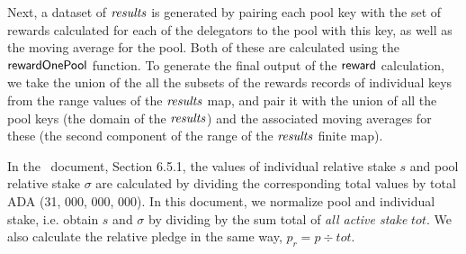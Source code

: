 Next, a dataset of $\mathit{results}$ is generated by pairing each pool key with
the set of rewards calculated for each of the delegators to the pool with this
key, as well as the moving average for the pool. Both of these are calculated
using the $\mathsf{rewardOnePool}$ function.  To generate the final output of the
$\mathsf{reward}$ calculation, we take the union of the all the subsets of the
rewards records of individual keys from the range values of the $\mathit{results}$
map, and pair it with the union of all the pool keys (the domain of the
$\mathit{results}$) and the associated moving averages for these (the second
component of the range of the $\mathit{results}$ finite map).

\begin{note}
In the~\cite{delegation_design} document, Section 6.5.1, the values of individual
relative stake $s$ and pool relative stake $\sigma$ are calculated by
dividing the corresponding total values by total ADA (31, 000, 000, 000). In this
document, we normalize pool and individual stake, i.e. obtain $s$ and $\sigma$
by dividing by the sum total of \textit{all active stake} $tot$. We also calculate
the relative pledge in the same way, $p_r = p \div tot$.
\end{note}

